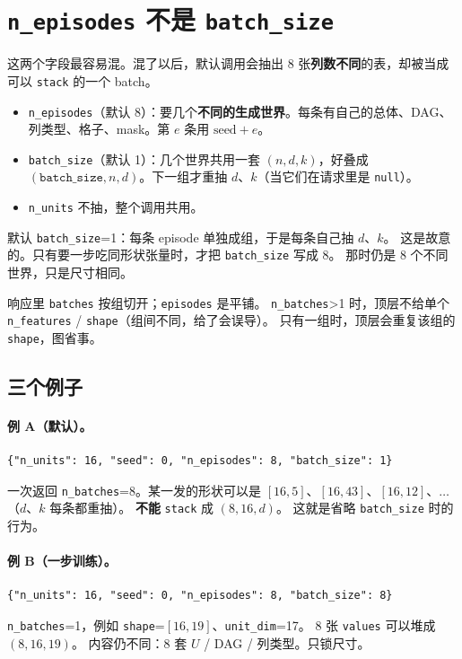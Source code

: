 \documentclass[11pt,a4paper,fontset=none]{ctexart}
\begin{document}
\section{\texttt{n\_episodes} 不是 \texttt{batch\_size}}
\label{sec:batch}

这两个字段最容易混。混了以后，默认调用会抽出 8 张\textbf{列数不同}的表，却被当成可以 \texttt{stack} 的一个 batch。

\begin{itemize}
  \item \texttt{n\_episodes}（默认 8）：要几个\textbf{不同的生成世界}。每条有自己的总体、DAG、列类型、格子、mask。第 $e$ 条用 $\mathrm{seed}+e$。
  \item \texttt{batch\_size}（默认 1）：几个世界共用一套 $(n,d,k)$，好叠成 $(\texttt{batch\_size}, n, d)$。下一组才重抽 $d$、$k$（当它们在请求里是 \texttt{null}）。
  \item \texttt{n\_units} 不抽，整个调用共用。
\end{itemize}

默认 \texttt{batch\_size}=1：每条 episode 单独成组，于是每条自己抽 $d$、$k$。
这是故意的。只有要一步吃同形状张量时，才把 \texttt{batch\_size} 写成 8。
那时仍是 8 个不同世界，只是尺寸相同。

响应里 \texttt{batches} 按组切开；\texttt{episodes} 是平铺。
\texttt{n\_batches}>1 时，顶层不给单个 \texttt{n\_features} / \texttt{shape}（组间不同，给了会误导）。
只有一组时，顶层会重复该组的 \texttt{shape}，图省事。

\subsection{三个例子}

\paragraph{例 A（默认）。}
\begin{lstlisting}
{"n_units": 16, "seed": 0, "n_episodes": 8, "batch_size": 1}
\end{lstlisting}
一次返回 \texttt{n\_batches}=8。某一发的形状可以是
$[16,5]$、$[16,43]$、$[16,12]$、$\ldots$（$d$、$k$ 每条都重抽）。
\textbf{不能} \texttt{stack} 成 $(8,16,d)$。
这就是省略 \texttt{batch\_size} 时的行为。

\paragraph{例 B（一步训练）。}
\begin{lstlisting}
{"n_units": 16, "seed": 0, "n_episodes": 8, "batch_size": 8}
\end{lstlisting}
\texttt{n\_batches}=1，例如 \texttt{shape}=$[16,19]$、\texttt{unit\_dim}=17。
8 张 \texttt{values} 可以堆成 $(8,16,19)$。
内容仍不同：8 套 $U$ / DAG / 列类型。只锁尺寸。
\end{document}
